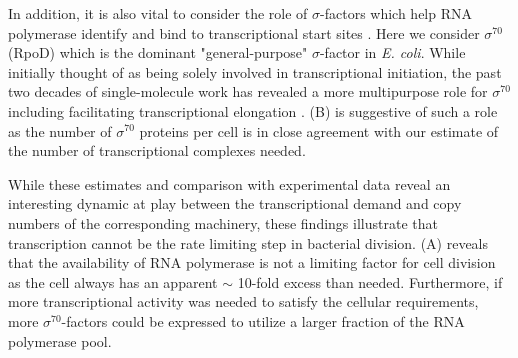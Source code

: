 In addition, it is also vital to consider the role of $\sigma$-factors which
help RNA polymerase identify and bind to transcriptional start sites
\citep{browning2016}. Here we consider $\sigma^{70}$ (RpoD) which is the
dominant "general-purpose" $\sigma$-factor in \textit{E. coli}. While initially
thought of as being solely involved in transcriptional initiation, the past two
decades of single-molecule work has revealed a more multipurpose role for
$\sigma^{70}$ including facilitating transcriptional elongation
\citep{kapanidis2005, goldman2015, perdue2011,mooney2003,mooney2005}.
 (B) is suggestive of such a role as the number of
$\sigma^{70}$ proteins per cell is in close agreement with our estimate of the
number of transcriptional complexes needed.


While these estimates and comparison with experimental data reveal an
interesting dynamic at play between the transcriptional demand and copy numbers
of the corresponding machinery, these findings illustrate that transcription
cannot be the rate limiting step in bacterial division.  (A)
reveals that the availability of RNA polymerase is not a limiting factor for
cell division as the cell always has an apparent $\sim$ 10-fold excess than needed.
Furthermore, if more transcriptional activity was needed to satisfy the cellular
requirements, more $\sigma^{70}$-factors could be expressed to utilize a larger
fraction of the RNA polymerase pool.

